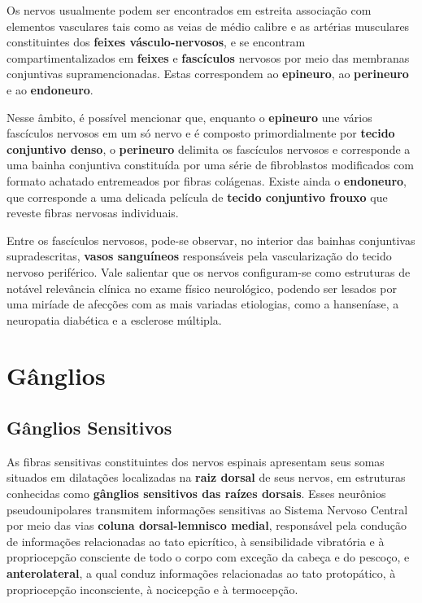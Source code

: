 \documentclass[
]{book}
\begin{document}
Os nervos usualmente podem ser encontrados em estreita associação com elementos vasculares tais como as veias de médio calibre e as artérias musculares constituintes dos \textbf{feixes vásculo-nervosos}, e se encontram compartimentalizados em \textbf{feixes} e \textbf{fascículos} nervosos por meio das membranas conjuntivas supramencionadas. Estas correspondem ao \textbf{epineuro}, ao \textbf{perineuro} e ao \textbf{endoneuro}.

Nesse âmbito, é possível mencionar que, enquanto o \textbf{epineuro} une vários fascículos nervosos em um só nervo e é composto primordialmente por \textbf{tecido conjuntivo denso}, o \textbf{perineuro} delimita os fascículos nervosos e corresponde a uma bainha conjuntiva constituída por uma série de fibroblastos modificados com formato achatado entremeados por fibras colágenas. Existe ainda o \textbf{endoneuro}, que corresponde a uma delicada película de \textbf{tecido conjuntivo frouxo} que reveste fibras nervosas individuais.

Entre os fascículos nervosos, pode-se observar, no interior das bainhas conjuntivas supradescritas, \textbf{vasos sanguíneos} responsáveis pela vascularização do tecido nervoso periférico. Vale salientar que os nervos configuram-se como estruturas de notável relevância clínica no exame físico neurológico, podendo ser lesados por uma miríade de afecções com as mais variadas etiologias, como a hanseníase, a neuropatia diabética e a esclerose múltipla.

\hypertarget{guxe2nglios}{%
\chapter{Gânglios}\label{guxe2nglios}}

\hypertarget{guxe2nglios-sensitivos}{%
\section{Gânglios Sensitivos}\label{guxe2nglios-sensitivos}}

As fibras sensitivas constituintes dos nervos espinais apresentam seus somas situados em dilatações localizadas na \textbf{raiz dorsal} de seus nervos, em estruturas conhecidas como \textbf{gânglios sensitivos das raízes dorsais}. Esses neurônios pseudounipolares transmitem informações sensitivas ao Sistema Nervoso Central por meio das vias \textbf{coluna dorsal-lemnisco medial}, responsável pela condução de informações relacionadas ao tato epicrítico, à sensibilidade vibratória e à propriocepção consciente de todo o corpo com exceção da cabeça e do pescoço, e \textbf{anterolateral}, a qual conduz informações relacionadas ao tato protopático, à propriocepção inconsciente, à nocicepção e à termocepção.
\end{document}
